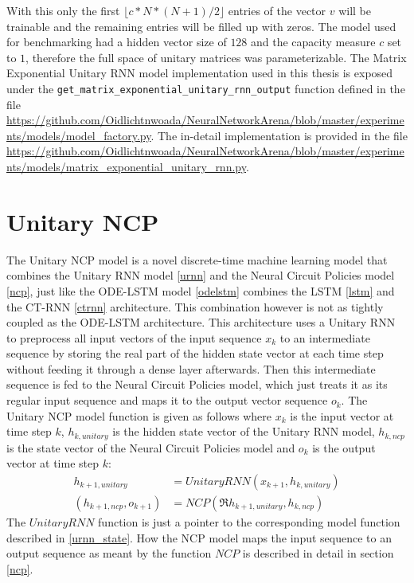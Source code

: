 \documentclass[draft,final]{vutinfth} %
\begin{document}
    With this only the first $\lfloor c*N*(N+1)/2 \rfloor$ entries of the vector $v$ will be trainable and the remaining entries will be filled up with zeros.
    The model used for benchmarking had a hidden vector size of $128$ and the capacity measure $c$ set to $1$, therefore the full space of unitary matrices was parameterizable.
    The Matrix Exponential Unitary RNN model implementation used in this thesis is exposed under the \texttt{get\_matrix\_exponential\_unitary\_rnn\_output} function defined in the file \url{https://github.com/Oidlichtnwoada/NeuralNetworkArena/blob/master/experiments/models/model_factory.py}.
    The in-detail implementation is provided in the file \url{https://github.com/Oidlichtnwoada/NeuralNetworkArena/blob/master/experiments/models/matrix_exponential_unitary_rnn.py}.

    \section{Unitary NCP} \label{uncp}
    The Unitary NCP model is a novel discrete-time machine learning model that combines the Unitary RNN model \ref{urnn} and the Neural Circuit Policies model \ref{ncp}, just like the ODE-LSTM model \ref{odelstm} combines the LSTM \ref{lstm} and the CT-RNN \ref{ctrnn} architecture.
    This combination however is not as tightly coupled as the ODE-LSTM architecture. 
    This architecture uses a Unitary RNN to preprocess all input vectors of the input sequence $x_k$ to an intermediate sequence by storing the real part of the hidden state vector at each time step without feeding it through a dense layer afterwards.
    Then this intermediate sequence is fed to the Neural Circuit Policies model, which just treats it as its regular input sequence and maps it to the output vector sequence $o_k$.
    The Unitary NCP model function is given as follows where $x_k$ is the input vector at time step $k$, $h_{k,unitary}$ is the hidden state vector of the Unitary RNN model, $h_{k,ncp}$ is the state vector of the Neural Circuit Policies model and $o_k$ is the output vector at time step $k$:
    \begin{align}
    h_{k+1,unitary} &= UnitaryRNN(x_{k+1}, h_{k,unitary}) \\
    (h_{k+1,ncp}, o_{k+1}) &= NCP(\Re{h_{k+1,unitary}}, h_{k,ncp})
    \end{align}
    The $UnitaryRNN$ function is just a pointer to the corresponding model function described in \ref{urnn_state}.
    How the NCP model maps the input sequence to an output sequence as meant by the function $NCP$ is described in detail in section \ref{ncp}.
\end{document}
